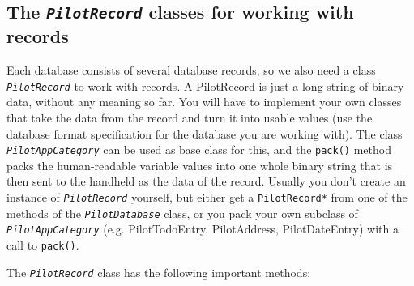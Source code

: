 \documentclass[10pt,a4paper]{article}
\newcommand{\code}[1]{{\small\texttt{#1}}}
\newcommand{\class}[1]{{\small\em\texttt{#1}}}
\begin{document}
\subsection{The \class{PilotRecord} classes for working with records}

Each database consists of several database records, so we also need a 
class \class{PilotRecord} to work with records. A PilotRecord is just 
a long string of binary data, without any meaning so far. You will 
have to implement your own classes that take the data from the record 
and turn it into usable values (use the database format specification 
for the database you are working with). The class \class{PilotAppCategory} 
can be used as base class for this, and the \code{pack()} method packs 
the human-readable variable values into one whole binary string that 
is then sent to the handheld as the data of the record. Usually you 
don't create an instance of \class{PilotRecord} yourself, but either 
get a \code{PilotRecord*} from one of the methods of the \class{PilotDatabase} 
class, or you pack your own subclass of \class{PilotAppCategory} (e.g. 
PilotTodoEntry, PilotAddress, PilotDateEntry) with a call to \code{pack()}.

The \class{PilotRecord} class has the following important methods:
\end{document}
